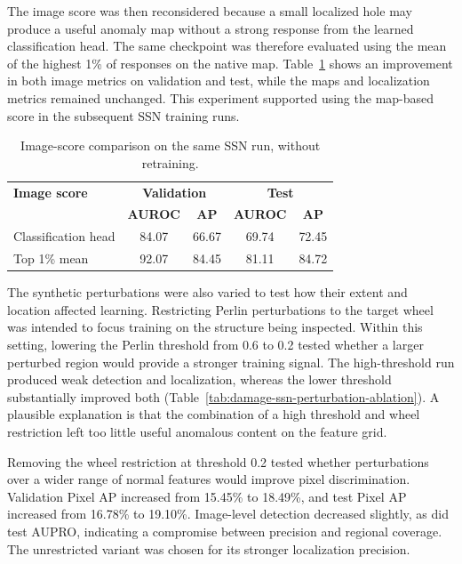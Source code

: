 The image score was then reconsidered because a small localized hole may produce a useful anomaly map without a strong response from the learned classification head. The same checkpoint was therefore evaluated using the mean of the highest 1\% of responses on the native map. Table~\ref{tab:damage-ssn-score-ablation} shows an improvement in both image metrics on validation and test, while the maps and localization metrics remained unchanged. This experiment supported using the map-based score in the subsequent SSN training runs.

\begin{table}[ht!]
    \centering
    \small
    \begin{tabular}{@{}l c c c c@{}}
        \toprule
        \textbf{Image score} & \multicolumn{2}{c}{\textbf{Validation}} & \multicolumn{2}{c}{\textbf{Test}}                                \\
                             & \textbf{AUROC}                          & \textbf{AP}                       & \textbf{AUROC} & \textbf{AP} \\
        \midrule
        \midrule
        Classification head  & 84.07                                   & 66.67                             & 69.74          & 72.45       \\
        Top 1\% mean         & 92.07                                   & 84.45                             & 81.11          & 84.72       \\
        \bottomrule
    \end{tabular}
    \vspace{5mm}
    \caption{Image-score comparison on the same SSN run, without retraining.}
    \label{tab:damage-ssn-score-ablation}
\end{table}

The synthetic perturbations were also varied to test how their extent and location affected learning. Restricting Perlin perturbations to the target wheel was intended to focus training on the structure being inspected. Within this setting, lowering the Perlin threshold from 0.6 to 0.2 tested whether a larger perturbed region would provide a stronger training signal. The high-threshold run produced weak detection and localization, whereas the lower threshold substantially improved both (Table~\ref{tab:damage-ssn-perturbation-ablation}). A plausible explanation is that the combination of a high threshold and wheel restriction left too little useful anomalous content on the feature grid.

Removing the wheel restriction at threshold 0.2 tested whether perturbations over a wider range of normal features would improve pixel discrimination. Validation Pixel AP increased from 15.45\% to 18.49\%, and test Pixel AP increased from 16.78\% to 19.10\%. Image-level detection decreased slightly, as did test AUPRO, indicating a compromise between precision and regional coverage. The unrestricted variant was chosen for its stronger localization precision.


